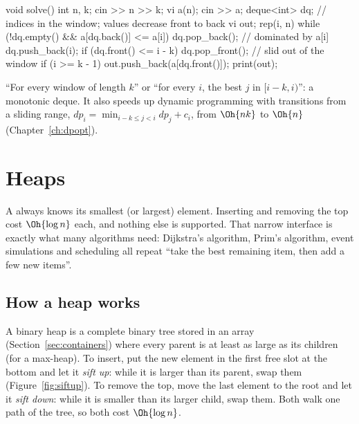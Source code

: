 \begin{code}
void solve() {
    int n, k;
    cin >> n >> k;
    vi a(n);
    cin >> a;
    deque<int> dq;  // indices in the window; values decrease front to back
    vi out;
    rep(i, n) {
        while (!dq.empty() && a[dq.back()] <= a[i])
            dq.pop_back();  // dominated by a[i]
        dq.push_back(i);
        if (dq.front() <= i - k) dq.pop_front();  // slid out of the window
        if (i >= k - 1) out.push_back(a[dq.front()]);
    }
    print(out);
}
\end{code}

\begin{recognize}
``For every window of length $k$'' or ``for every $i$, the best $j$ in $[i - k, i)$'': a monotonic deque. It also speeds
up dynamic programming with transitions from a sliding range, $dp_i = \min_{i-k \le j < i} dp_j + c_i$, from $\Oh{nk}$ to
$\Oh{n}$ (Chapter~\ref{ch:dpopt}).
\end{recognize}


\section[Heaps]{Heaps \hfill \silver}\label{sec:heaps}

A  always knows its smallest (or largest) element. Inserting and removing the top cost $\Oh{\log n}$ each, and
nothing else is supported. That narrow interface is exactly what many algorithms need: Dijkstra's algorithm, Prim's
algorithm, event simulations and scheduling all repeat ``take the best remaining item, then add a few new items''.

\subsection{How a heap works}

A binary heap is a complete binary tree stored in an array (Section~\ref{sec:containers}) where every parent is at least as
large as its children (for a max-heap). To insert, put the new element in the first free slot at the bottom and let it
\emph{sift up}: while it is larger than its parent, swap them (Figure~\ref{fig:siftup}). To remove the top, move the last
element to the root and let it \emph{sift down}: while it is smaller than its larger child, swap them. Both walk one path
of the tree, so both cost $\Oh{\log n}$.

